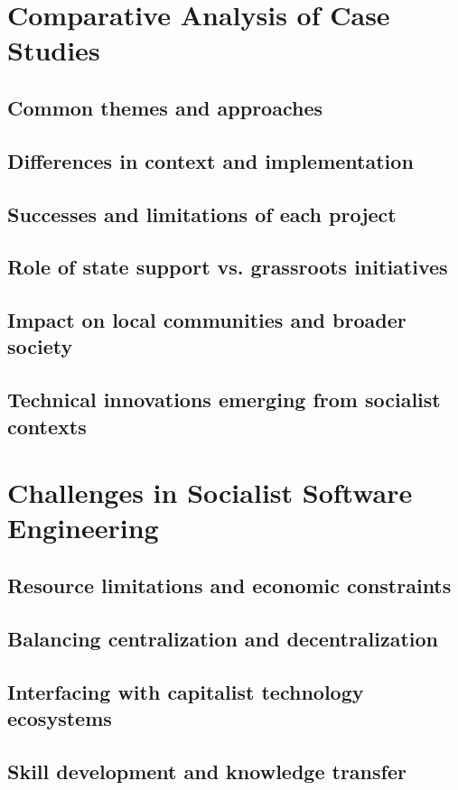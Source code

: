\newpage

\section{Comparative Analysis of Case Studies}
\subsection{Common themes and approaches}
\subsection{Differences in context and implementation}
\subsection{Successes and limitations of each project}
\subsection{Role of state support vs. grassroots initiatives}
\subsection{Impact on local communities and broader society}
\subsection{Technical innovations emerging from socialist contexts}

\newpage

\section{Challenges in Socialist Software Engineering}
\subsection{Resource limitations and economic constraints}
\subsection{Balancing centralization and decentralization}
\subsection{Interfacing with capitalist technology ecosystems}
\subsection{Skill development and knowledge transfer}
